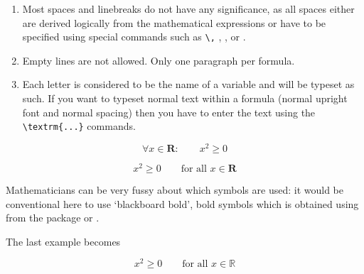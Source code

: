 \begin{enumerate}

\item Most spaces and linebreaks do not have any significance, as all spaces
either are derived logically from the mathematical expressions or
have to be specified using special commands such as \verb|\,| , , or .
 
\item Empty lines are not allowed. Only one paragraph per formula.

\item Each letter is considered to be the name of a variable and will be
typeset as such. If you want to typeset normal text within a formula
(normal upright font and normal spacing) then you have to enter the
text using the \verb|\textrm{...}| commands.
\end{enumerate}


\begin{singlespace}
\begin{example}
\begin{equation}
\forall x \in \mathbf{R}:
\qquad x^{2} \geq 0
\end{equation}
\end{example}
\end{singlespace}

\begin{singlespace}
\begin{example}
\begin{equation}
x^{2} \geq 0\qquad
\textrm{for all }x\in\mathbf{R}
\end{equation}
\end{example}
\end{singlespace}

Mathematicians can be very fussy about which symbols are used:
it would be conventional here to use `blackboard bold',
bold symbols which is obtained using  from the
package  or .

\ifx\mathbb\undefined\else
The last example becomes
\begin{singlespace}
\begin{example}
\begin{displaymath}
x^{2} \geq 0\qquad
\textrm{for all }x\in\mathbb{R}
\end{displaymath}
\end{example}
\end{singlespace}
\fi

